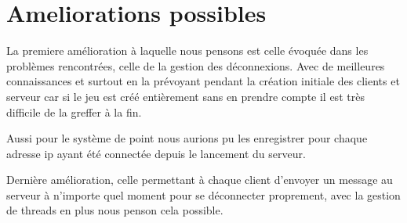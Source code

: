 \documentclass[10pt,a4paper]{article} %
\begin{document}
    
    \section{Ameliorations possibles}
    
    La premiere amélioration à laquelle nous pensons est celle évoquée dans les problèmes rencontrées, celle de la gestion des déconnexions. Avec de meilleures connaissances et surtout en la prévoyant pendant la création initiale des clients et serveur car si le jeu est créé entièrement sans en prendre compte il est très difficile de la greffer à la fin.
    
    Aussi pour le système de point nous aurions pu les enregistrer pour chaque adresse ip ayant été connectée depuis le lancement du serveur.
    
    Dernière amélioration, celle permettant à chaque client d'envoyer un message au serveur à n'importe quel moment pour se déconnecter proprement, avec la gestion de threads en plus nous penson cela possible.
\end{document}
